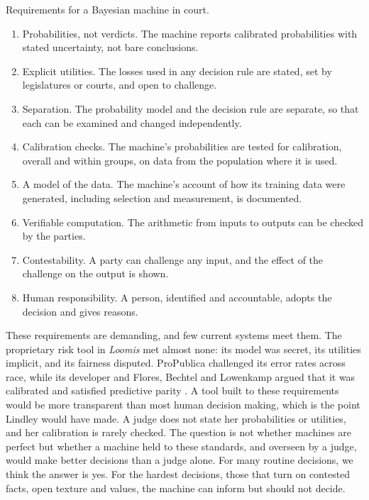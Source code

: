 \begin{keybox}
Requirements for a Bayesian machine in court.
\begin{enumerate}[label=\arabic*.]
\item Probabilities, not verdicts. The machine reports calibrated probabilities with stated uncertainty, not bare conclusions.
\item Explicit utilities. The losses used in any decision rule are stated, set by legislatures or courts, and open to challenge.
\item Separation. The probability model and the decision rule are separate, so that each can be examined and changed independently.
\item Calibration checks. The machine's probabilities are tested for calibration, overall and within groups, on data from the population where it is used.
\item A model of the data. The machine's account of how its training data were generated, including selection and measurement, is documented.
\item Verifiable computation. The arithmetic from inputs to outputs can be checked by the parties.
\item Contestability. A party can challenge any input, and the effect of the challenge on the output is shown.
\item Human responsibility. A person, identified and accountable, adopts the decision and gives reasons.
\end{enumerate}
\end{keybox}

These requirements are demanding, and few current systems meet them. The proprietary risk tool in \emph{Loomis} met almost none: its model was secret, its utilities implicit, and its fairness disputed. ProPublica challenged its error rates across race, while its developer \citep{dieterich2016} and Flores, Bechtel and Lowenkamp argued that it was calibrated and satisfied predictive parity \citep{flores2016}. A tool built to these requirements would be more transparent than most human decision making, which is the point Lindley would have made. A judge does not state her probabilities or utilities, and her calibration is rarely checked. The question is not whether machines are perfect but whether a machine held to these standards, and overseen by a judge, would make better decisions than a judge alone. For many routine decisions, we think the answer is yes. For the hardest decisions, those that turn on contested facts, open texture and values, the machine can inform but should not decide.

